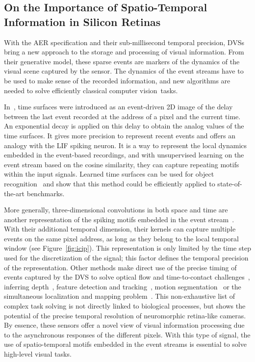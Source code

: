 \documentclass[brainsci, %
               review,accept,pdftex,moreauthors
               ]{Definitions/mdpi}
\begin{document}
\subsection{On the Importance of Spatio-Temporal Information in Silicon Retinas}
%
With the AER specification and their sub-millisecond temporal precision, DVSs bring a new approach to the storage and processing of visual information. From their generative model, these sparse events are markers of the dynamics of the visual scene captured by the sensor. The dynamics of the event streams have to be used to make sense of the recorded information, and new algorithms are needed to solve efficiently classical computer vision~tasks. 

In~\citep{lagorce_hots_2017}, time surfaces were introduced as an event-driven 2D image of the delay between the last event recorded at the address of a pixel and the current time. An exponential decay is applied on this delay to obtain the analog values of the time surfaces. It gives more precision to represent recent events and offers an analogy with the LIF spiking neuron. It is a way to represent the local dynamics embedded in the event-based recordings, and with unsupervised learning on the event stream based on the cosine similarity, they can capture repeating motifs within the input signals. Learned time surfaces can be used for object recognition~\citep{lagorce_hots_2017, sironi_hats_2018, maro_event-based_2020, grimaldi_homeostatic_2021,grimaldi_robust_2022} and show that this method could be efficiently applied to state-of-the-art benchmarks.

More generally, three-dimensional convolutions in both space and time are another representation of the spiking motifs embedded in the event stream~\citep{ghosh_spatiotemporal_2019, grimaldi_learning_2022, yu_stsc-snn_2022}. With their additional temporal dimension, their kernels can capture multiple events on the same pixel address, as long as they belong to the local temporal window (see Figure~\ref{fig:icip}). This representation is only limited by the time step used for the discretization of the signal; this factor defines the temporal precision of the representation. Other methods make direct use of the precise timing of events captured by the DVS to solve optical flow and time-to-contact challenges~\citep{benosman_event-based_2014, clady_asynchronous_2014, tschechne_bio-inspired_2014}, inferring depth~\citep{hidalgo-carrio_learning_2020}, feature detection and tracking~\citep{dardelet_event-by-event_2021}, motion segmentation~\citep{stoffregen_event-based_2019} or the simultaneous localization and mapping problem~\citep{kim_real-time_2016}. This non-exhaustive list of complex task solving is not directly linked to biological processes, but shows the potential of the precise temporal resolution of neuromorphic retina-like cameras. By essence, these sensors offer a novel view of visual information processing due to the asynchronous responses of the different pixels. With this type of signal, the use of spatio-temporal motifs embedded in the event streams is essential to solve high-level visual tasks. 
\end{document}

